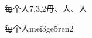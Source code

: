 \begin{entry}{每个人}{7,3,2}{⽏、⼈、⼈}
  \begin{phonetics}{每个人}{mei3ge5ren2}
  \end{phonetics}
\end{entry}
